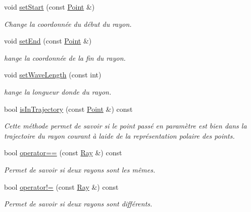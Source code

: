 \begin{DoxyCompactItemize}
void \hyperlink{classRay_ae329146aa527a3f7b403a818e61f38b7}{set\+Start} (const \hyperlink{classPoint}{Point} \&)
\begin{DoxyCompactList}\small\item\em Change la coordonnée du début du rayon. \end{DoxyCompactList}\item 
void \hyperlink{classRay_aeebe4e189ed7171473ebd356fb850f63}{set\+End} (const \hyperlink{classPoint}{Point} \&)
\begin{DoxyCompactList}\small\item\em hange la coordonnée de la fin du rayon. \end{DoxyCompactList}\item 
void \hyperlink{classRay_ae270a15e468c912d435273576830ef0b}{set\+Wave\+Length} (const int)
\begin{DoxyCompactList}\small\item\em hange la longueur d\textquotesingle{}onde du rayon. \end{DoxyCompactList}\item 
bool \hyperlink{classRay_a011572c6f75a3bf6fcf0f5d14636d829}{is\+In\+Trajectory} (const \hyperlink{classPoint}{Point} \&) const 
\begin{DoxyCompactList}\small\item\em Cette méthode permet de savoir si le point passé en paramètre est bien dans la trajectoire du rayon courant à l\textquotesingle{}aide de la représentation polaire des points. \end{DoxyCompactList}\item 
bool \hyperlink{classRay_abdb7998a61b33ea144e6113b2e361081}{operator==} (const \hyperlink{classRay}{Ray} \&) const 
\begin{DoxyCompactList}\small\item\em Permet de savoir si deux rayons sont les mêmes. \end{DoxyCompactList}\item 
bool \hyperlink{classRay_af4481fb5fdefb9ac5e1572f458bb14e9}{operator!=} (const \hyperlink{classRay}{Ray} \&) const 
\begin{DoxyCompactList}\small\item\em Permet de savoir si deux rayons sont différents. \end{DoxyCompactList}\end{DoxyCompactItemize}
